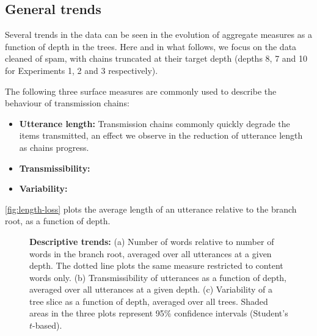 \subsection{General trends}\label{sec:gistr-results-general}

Several trends in the data can be seen in the evolution of aggregate measures as a function of depth in the trees. Here and in what follows, we focus on the data cleaned of spam, with chains truncated at their target depth (depths 8, 7 and 10 for Experiments 1, 2 and 3 respectively).

The following three surface measures are commonly used to describe the behaviour of transmission chains:

\begin{itemize}
	\item \textbf{Utterance length:}
	Transmission chains commonly quickly degrade the items transmitted, an effect we observe in the reduction of utterance length as chains progress.
	
	\item \textbf{Transmissibility:}
	
	
	\item \textbf{Variability:}
	
	
\end{itemize}

\cref{fig:length-loss} plots the average length of an utterance relative to the branch root, as a function of depth.

	

\begin{figure}[!ht]
  \centering
  \caption{
  \textbf{Descriptive trends:}
  (a) Number of words relative to number of words in the branch root, averaged over all utterances at a given depth. The dotted line plots the same measure restricted to content words only.
  (b) Transmissibility of utterances as a function of depth, averaged over all utterances at a given depth.
  (c) Variability of a tree slice as a function of depth, averaged over all trees.
  Shaded areas in the three plots represent 95\% confidence intervals (Student's $t$-based).
  }
  \label{fig:general-trends}
\end{figure}



